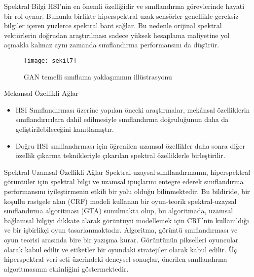 \documentclass{beamer}
\begin{document}
\begin{frame}{Spektral Bilgi}
	HSI’nin en önemli özelliğidir ve sınıflandırma görevlerinde hayati bir rol oynar. Bununla birlikte hiperspektral uzak sensörler genellikle gereksiz bilgiler içeren yüzlerce spektral bant sağlar. Bu nedenle orijinal spektral vektörlerin doğrudan araştırılması sadece yüksek hesaplama maliyetine yol açmakla kalmaz aynı zamanda sınıflandırma performansını da düşürür.
\end{frame}

\begin{frame}
	\begin{figure}[]
		\texttt{[image: sekil7]}
		\label{fig:sekil3}
		\caption{GAN temelli sınıflama yaklaşımının illüstrasyonu}
	\end{figure}
\end{frame}

\begin{frame}{Mekansal Özellikli Ağlar}
\begin{itemize}
	\item HSI Sınıflandırması üzerine yapılan önceki araştırmalar, mekânsal özelliklerin sınıflandırıcılara dahil edilmesiyle sınıflandırma doğruluğunun daha da geliştirilebileceğini kanıtlamıştır.
	\item Doğru HSI sınıflandırması için öğrenilen uzamsal özellikler daha sonra diğer özellik çıkarma teknikleriyle çıkarılan spektral özelliklerle birleştirilir.
\end{itemize}
\end{frame}

\begin{frame}{Spektral-Uzamsal Özellikli Ağlar }
	Spektral-uzaysal sınıflandırmanın, hiperspektral görüntüler için spektral bilgi ve uzamsal ipuçlarını entegre ederek sınıflandırma performansını iyileştirmenin etkili bir yolu olduğu bilinmektedir. Bu bildiride, bir koşullu rastgele alan (CRF) modeli kullanan bir oyun-teorik spektral-uzaysal sınıflandırma algoritması (GTA) sunulmakta olup, bu algoritmada, uzamsal bağlamsal bilgiyi dikkate alarak görüntüyü modellemek için CRF'nin kullanıldığı ve bir işbirlikçi oyun tasarlanmaktadır. Algoritma, görüntü sınıflandırması ve oyun teorisi arasında bire bir yazışma kurar. Görüntünün pikselleri oyuncular olarak kabul edilir ve etiketler bir oyundaki stratejiler olarak kabul edilir. Üç hiperspektral veri seti üzerindeki deneysel sonuçlar, önerilen sınıflandırma algoritmasının etkinliğini göstermektedir.
\end{frame}
\end{document}
